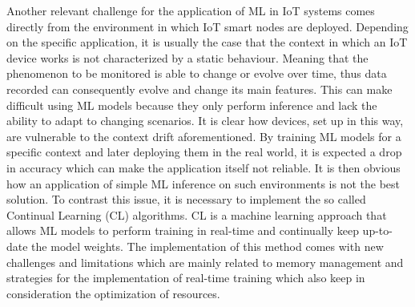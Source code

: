 \documentclass[12pt]{report}
\begin{document}
Another relevant challenge for the application of ML in IoT systems comes directly from the environment in which IoT smart nodes are deployed. Depending on the specific application, it is usually the case that the context in which an IoT device works is not characterized by a static behaviour. Meaning that the phenomenon to be monitored is able to change or evolve over time, thus data recorded can consequently evolve and change its main features. This can make difficult using ML models because they only perform inference and lack the ability to adapt to changing scenarios. It is clear how devices, set up in this way, are vulnerable to the context drift aforementioned.
By training ML models for a specific context and later deploying them in the real world, it is expected a drop in accuracy which can make the application itself not reliable. It is then obvious how an application of simple ML inference on such environments is not the best solution. To contrast this issue, it is necessary to implement the so called Continual Learning (CL) algorithms. CL is a machine learning approach that allows ML models to perform training in real-time and continually keep up-to-date the model weights. The implementation of this method comes with new challenges and limitations which are mainly related to memory management and strategies for the implementation of real-time training which also keep in consideration the optimization of resources.
\bigskip
\end{document}
